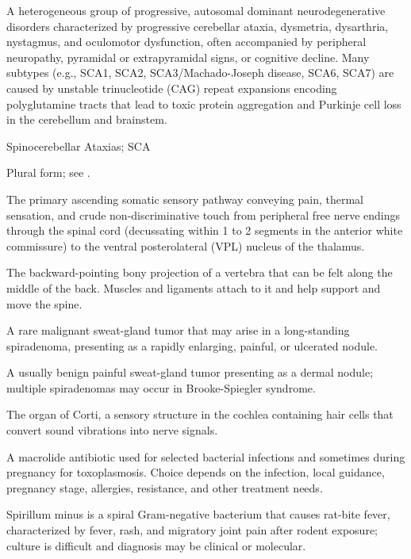  A heterogeneous group of progressive, autosomal dominant neurodegenerative disorders characterized by progressive cerebellar ataxia, dysmetria, dysarthria, nystagmus, and oculomotor dysfunction, often accompanied by peripheral neuropathy, pyramidal or extrapyramidal signs, or cognitive decline. Many subtypes (e.g., SCA1, SCA2, SCA3/Machado-Joseph disease, SCA6, SCA7) are caused by unstable trinucleotide (CAG) repeat expansions encoding polyglutamine tracts that lead to toxic protein aggregation and Purkinje cell loss in the cerebellum and brainstem.

\synonyms
Spinocerebellar Ataxias; SCA

 Plural form; see .

 The primary ascending somatic sensory pathway conveying pain, thermal sensation, and crude non-discriminative touch from peripheral free nerve endings through the spinal cord (decussating within 1 to 2 segments in the anterior white commissure) to the ventral posterolateral (VPL) nucleus of the thalamus.

 The backward-pointing bony projection of a vertebra that can be felt along the middle of the back. Muscles and ligaments attach to it and help support and move the spine.

 A rare malignant sweat-gland tumor that may arise in a long-standing spiradenoma, presenting as a rapidly enlarging, painful, or ulcerated nodule.

 A usually benign painful sweat-gland tumor presenting as a dermal nodule; multiple spiradenomas may occur in Brooke-Spiegler syndrome.

 The organ of Corti, a sensory structure in the cochlea containing hair cells that convert sound vibrations into nerve signals.

 A macrolide antibiotic used for selected bacterial infections and sometimes during pregnancy for toxoplasmosis. Choice depends on the infection, local guidance, pregnancy stage, allergies, resistance, and other treatment needs.

 Spirillum minus is a spiral Gram-negative bacterium that causes rat-bite fever, characterized by fever, rash, and migratory joint pain after rodent exposure; culture is difficult and diagnosis may be clinical or molecular.

